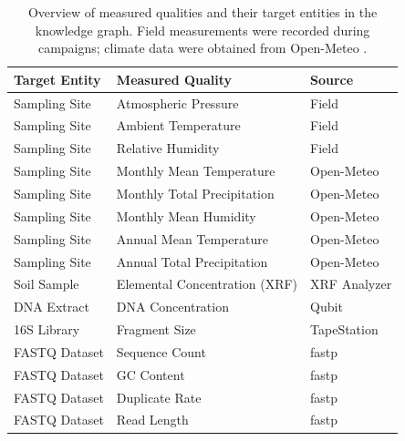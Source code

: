 \begin{table}[h]
	\centering
	\caption{Overview of measured qualities and their target entities in the knowledge graph. Field measurements were recorded during campaigns; climate data were obtained from Open-Meteo \cite{openmeteo}.}
	\label{tab:measurements}
	\begin{tabular}{lll}
		\toprule
		Target Entity & Measured Quality              & Source \\
		\midrule
		Sampling Site & Atmospheric Pressure          & Field  \\
		Sampling Site & Ambient Temperature           & Field  \\
		Sampling Site & Relative Humidity             & Field  \\
		Sampling Site & Monthly Mean Temperature      & Open-Meteo \\
		Sampling Site & Monthly Total Precipitation   & Open-Meteo \\
		Sampling Site & Monthly Mean Humidity          & Open-Meteo \\
		Sampling Site & Annual Mean Temperature       & Open-Meteo \\
		Sampling Site & Annual Total Precipitation    & Open-Meteo \\
		Soil Sample   & Elemental Concentration (XRF) & XRF Analyzer \\
		DNA Extract   & DNA Concentration             & Qubit \\
		16S Library   & Fragment Size                 & TapeStation \\
		FASTQ Dataset & Sequence Count                & fastp \\
		FASTQ Dataset & GC Content                    & fastp \\
		FASTQ Dataset & Duplicate Rate                & fastp \\
		FASTQ Dataset & Read Length                   & fastp \\
		\bottomrule
	\end{tabular}
\end{table}
